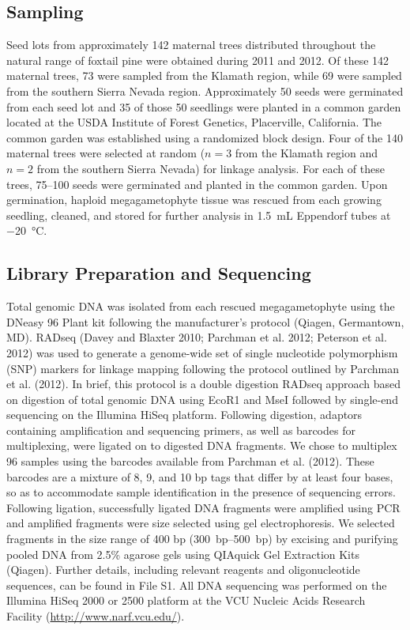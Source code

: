 \documentclass[11pt]{article}
\begin{document}
\subsection{Sampling}
Seed lots from approximately 142 maternal trees distributed throughout the natural range 
of foxtail pine were obtained during 2011 and 2012. Of these 142 maternal trees, 73 were sampled from the 
Klamath region, while 69 were sampled from the southern Sierra Nevada region. Approximately 
50 seeds were germinated from each seed lot and 35 of those 50 seedlings were planted in a 
common garden located at the USDA Institute of Forest Genetics, Placerville, California. The 
common garden was established using a randomized block design.
Four of the 140 maternal trees were selected at random ($n = 3$ from the Klamath region and $n = 2$ from 
the southern Sierra Nevada) for linkage analysis. For each of these trees, \SIrange{75}{100}{} 
seeds were germinated and planted in the common garden. Upon germination, haploid 
megagametophyte tissue was rescued from each growing seedling, cleaned, and stored for further 
analysis in \SI{1.5}{\mL} Eppendorf tubes at \SI{-20}{\celsius}.


\subsection{Library Preparation and Sequencing}
Total genomic DNA was isolated from each rescued megagametophyte using the DNeasy 96 Plant 
kit following the manufacturer’s protocol (Qiagen, Germantown, MD). RADseq (Davey and Blaxter 2010; Parchman et al. 2012; Peterson et al. 2012) 
was used to generate a genome-wide set of 
single nucleotide polymorphism (SNP) markers for linkage mapping following the protocol 
outlined by Parchman et al. (2012). In brief, this protocol is a double digestion RADseq 
approach based on digestion of total genomic DNA using EcoR1 and MseI followed by single-end 
sequencing on the Illumina HiSeq platform. Following digestion, adaptors 
containing amplification and sequencing primers, as well as barcodes for multiplexing, 
were ligated on to digested DNA fragments. We chose to multiplex 96 samples using the 
barcodes available from Parchman et al. (2012). These barcodes are a mixture of 8, 9, and 
10 bp tags that differ by at least four bases, so as to accommodate sample identification in the 
presence of sequencing errors. Following ligation, successfully ligated DNA fragments were 
amplified using PCR and amplified fragments were size selected using gel electrophoresis. We selected 
fragments in the size range of 400 bp (\SIrange{300}{500}{bp}) by excising and purifying pooled DNA from 2.5\% 
agarose gels using QIAquick Gel Extraction Kits (Qiagen). Further details, including relevant reagents and 
oligonucleotide sequences, can be found in File S1. All DNA sequencing was performed on the Illumina HiSeq 2000 or 2500
platform at the VCU Nucleic Acids Research Facility (\url{http://www.narf.vcu.edu/}).
\end{document}
